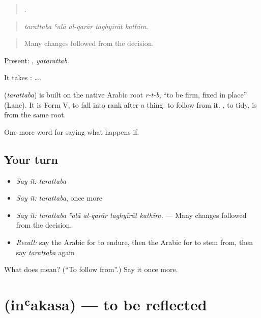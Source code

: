 \begin{quote}
    .
\end{quote}

\begin{quote}
\emph{tarattaba ʿalā al-qarār taghyīrāt kathīra.}
\end{quote}

\begin{quote}
Many changes followed from the decision.
\end{quote}

Present: , \emph{yatarattab}.

It takes :   ….

\begin{cousinweb}
\textbf{} (\emph{tarattaba}) is built on the native Arabic root \emph{r-t-b}, \textquotedblleft{}to be firm, fixed in place\textquotedblright{} (Lane). It is Form V, to fall into rank after a thing: to follow from it. , to tidy, is from the same root.
\end{cousinweb}

\begin{grammarlens}[title={What you've built}]
One more word for saying what happens if.
\end{grammarlens}

\subsection*{Your turn}
\begin{itemize}
\raggedright
  \item \emph{Say it:} \emph{tarattaba}
  \item \emph{Say it:} \emph{tarattaba}, once more
  \item \emph{Say it:} \emph{tarattaba ʿalā al-qarār taghyīrāt kathīra.} — Many changes followed from the decision.
  \item \emph{Recall:} say the Arabic for to endure, then the Arabic for to stem from, then say \emph{tarattaba} again
\end{itemize}

\begin{tcolorbox}[breakable,colback=teal!4,colframe=teal!35!black,title={Before you move on}]
What does  mean? (\textquotedblleft{}To follow from\textquotedblright{}.) Say it once more.
\end{tcolorbox}
\section[\texorpdfstring{\ar{انعكس} (inʿakasa)}{انعكس (inʿakasa)}]{ (inʿakasa) — to be reflected}

